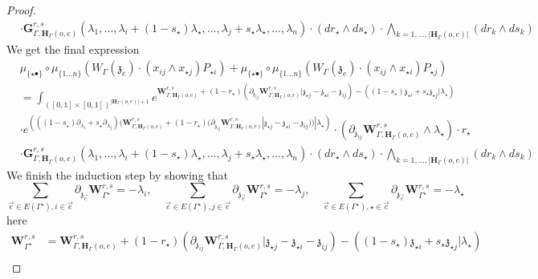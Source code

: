 \documentclass[11pt]{amsart}
\theoremstyle{definition}
\theoremstyle{remark}
\numberwithin{equation}{section}
\begin{document}
\begin{proof}
\begin{align*}
   &\cdot  \mathbf{G}^{r,s}_{\Gamma,\mathbf{H}_{\Gamma}(o,e)}(\lambda_1,\dots,\lambda_i+(1-s_{\star})\lambda_{\star},\dots,\lambda_j+s_{\star}\lambda_{\star},\dots,\lambda_{n})\cdot (dr_{\star}\wedge ds_{\star})\cdot \bigwedge_{k=1,\dots,|\mathbf{H}_{\Gamma}(o,e)|} (dr_k\wedge ds_k)\end{align*}
  We get the final expression
  \begin{align*}
     & \mu_{\{\star\bullet\}}\circ \mu_{\{1\dots n\}}\left(W_{\Gamma}(\mathfrak{z}_{e})\cdot (x_{ij}\wedge x_{\star j})P_{\star i }\right)+\mu_{\{\star\bullet\}}\circ \mu_{\{1\dots n\}}\left(W_{\Gamma}(\mathfrak{z}_{e})\cdot (x_{ij}\wedge x_{\star i})P_{\star j}\right)   \\
& = \int_{([0,1]\times[0,1])^{|\mathbf{H}_{\Gamma}(o,e)|+1}} e^{\mathbf{W}^{r,s}_{\Gamma,\mathbf{H}_{\Gamma}(o,e)}+(1-r_{\star})\left(\partial_{\mathfrak{z}_{ij}}\mathbf{W}^{r,s}_{\Gamma,\mathbf{H}_{\Gamma}(o,e)}|\mathfrak{z}_{\star j}-\mathfrak{z}_{\star i}-\mathfrak{z}_{ij}\right)-\left((1-s_{\star})\mathfrak{z}_{\star i}+s_{\star}\mathfrak{z}_{\star j}|\lambda_{\star}\right)} \\
   & \cdot e^{\left(((1-s_{\star})\partial_{\lambda_i}+s_{\star}\partial_{\lambda_j})(\mathbf{W}^{r,s}_{\Gamma,\mathbf{H}_{\Gamma}(o,e)}+(1-r_{\star})(\partial_{\mathfrak{z}_{ij}}\mathbf{W}^{r,s}_{\Gamma,\mathbf{H}_{\Gamma}(o,e)}|\mathfrak{z}_{\star j}-\mathfrak{z}_{\star i}-\mathfrak{z}_{ij}))|\lambda_{\star}\right)}\cdot \left(\partial_{\mathfrak{z}_{ij}}\mathbf{W}^{r,s}_{\Gamma,\mathbf{H}_{\Gamma}(o,e)}\wedge\lambda_{\star}\right)\cdot r_{\star}\\
   &\cdot  \mathbf{G}^{r,s}_{\Gamma,\mathbf{H}_{\Gamma}(o,e)}(\lambda_1,\dots,\lambda_i+(1-s_{\star})\lambda_{\star},\dots,\lambda_j+s_{\star}\lambda_{\star},\dots,\lambda_{n})\cdot (dr_{\star}\wedge ds_{\star})\cdot \bigwedge_{k=1,\dots,|\mathbf{H}_{\Gamma}(o,e)|} (dr_k\wedge ds_k)
  \end{align*}
  We finish the induction step by showing that
 $$
 \sum_{\vec{e}\in E(\Gamma^{\star}),i\in \vec{e}} \partial_{\mathfrak{z}_{\vec{e}}}  \mathbf{W}^{r,s}_{\Gamma^{\star}}=-\lambda_i,\quad  \sum_{\vec{e}\in E(\Gamma^{\star}),j\in \vec{e}} \partial_{\mathfrak{z}_{\vec{e}}}  \mathbf{W}^{r,s}_{\Gamma^{\star}}=-\lambda_j,\quad  \sum_{\vec{e}\in E(\Gamma^{\star}),\star\in \vec{e}} \partial_{\mathfrak{z}_{\vec{e}}}  \mathbf{W}^{r,s}_{\Gamma^{\star}}=-\lambda_{\star}
$$
here
  \begin{align*}
 \mathbf{W}^{r,s}_{\Gamma^{\star}}&=     \mathbf{W}^{r,s}_{\Gamma,\mathbf{H}_{\Gamma}(o,e)}+(1-r_{\star})\left(\partial_{\mathfrak{z}_{ij}}\mathbf{W}^{r,s}_{\Gamma,\mathbf{H}_{\Gamma}(o,e)}|\mathfrak{z}_{\star j}-\mathfrak{z}_{\star i}-\mathfrak{z}_{ij}\right)-\left((1-s_{\star})\mathfrak{z}_{\star i}+s_{\star}\mathfrak{z}_{\star j}|\lambda_{\star}\right) \\

\end{align*}
\end{proof}
\end{document}

